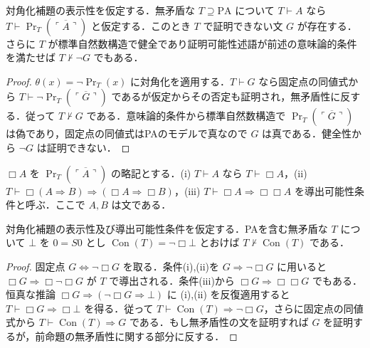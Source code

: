 \begin{prop}
対角化補題の表示性を仮定する．無矛盾な $T\supseteq\mathrm{PA}$ について $T\vdash A$ なら $T\vdash\operatorname{Pr}_T(\overline{\ulcorner A\urcorner})$ と仮定する．このとき $T$ で証明できない文 $G$ が存在する．さらに $T$ が標準自然数構造で健全であり証明可能性述語が前述の意味論的条件を満たせば $T\not\vdash\neg G$ でもある．
\end{prop}
\begin{proof}
$\theta(x)=\neg\operatorname{Pr}_T(x)$ に対角化を適用する．$T\vdash G$ なら固定点の同値式から $T\vdash\neg\operatorname{Pr}_T(\overline{\ulcorner G\urcorner})$ であるが仮定からその否定も証明され，無矛盾性に反する．従って $T\not\vdash G$ である．意味論的条件から標準自然数構造で $\operatorname{Pr}_T(\overline{\ulcorner G\urcorner})$ は偽であり，固定点の同値式はPAのモデルで真なので $G$ は真である．健全性から $\neg G$ は証明できない．
\end{proof}
\begin{defn}[導出可能性条件]
$\Box A$ を $\operatorname{Pr}_T(\overline{\ulcorner A\urcorner})$ の略記とする．(i) $T\vdash A$ なら $T\vdash\Box A$，(ii) $T\vdash\Box(A\Rightarrow B)\Rightarrow(\Box A\Rightarrow\Box B)$，(iii) $T\vdash\Box A\Rightarrow\Box\Box A$ を導出可能性条件と呼ぶ．ここで $A,B$ は文である．
\end{defn}
\begin{prop}
対角化補題の表示性及び導出可能性条件を仮定する．PAを含む無矛盾な $T$ について $\bot$ を $0=S0$ とし $\operatorname{Con}(T)=\neg\Box\bot$ とおけば $T\not\vdash\operatorname{Con}(T)$ である．
\end{prop}
\begin{proof}
固定点 $G\Leftrightarrow\neg\Box G$ を取る．条件(i),(ii)を $G\Rightarrow\neg\Box G$ に用いると $\Box G\Rightarrow\Box\neg\Box G$ が $T$ で導出される．条件(iii)から $\Box G\Rightarrow\Box\Box G$ でもある．恒真な推論 $\Box G\Rightarrow(\neg\Box G\Rightarrow\bot)$ に (i),(ii) を反復適用すると $T\vdash\Box G\Rightarrow\Box\bot$ を得る．従って $T\vdash\operatorname{Con}(T)\Rightarrow\neg\Box G$，さらに固定点の同値式から $T\vdash\operatorname{Con}(T)\Rightarrow G$ である．もし無矛盾性の文を証明すれば $G$ を証明するが，前命題の無矛盾性に関する部分に反する．
\end{proof}
